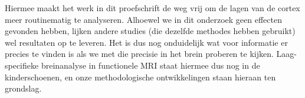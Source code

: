 Hiermee maakt het werk in dit proefschrift de weg vrij om de lagen van de cortex meer routinematig te analyseren. Alhoewel we in dit onderzoek geen effecten gevonden hebben, lijken andere studies (die dezelfde methodes hebben gebruikt) wel resultaten op te leveren. Het is dus nog onduidelijk wat voor informatie er precies te vinden is als we met die precisie in het brein proberen te kijken. Laag-specifieke breinanalyse in functionele MRI staat hiermee dus nog in de kinderschoenen, 
en onze methodologische ontwikkelingen staan hieraan ten grondslag.



